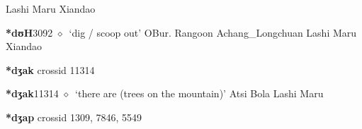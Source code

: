 \begin{list}{}{\leftmargin=1.5em \itemindent=-1.5em}
\hspace{1ex}
         Lashi 
\hspace{1ex}
         Maru 
\hspace{1ex}
         Xiandao 
  \item {\footnotesize \textbf{*dʊH}}{\tiny 3092}
\hspace{1ex}
         $\diamond$~`dig / scoop out'
         OBur. 
\hspace{1ex}
         Rangoon 
\hspace{1ex}
         Achang\_Longchuan 
\hspace{1ex}
         Lashi 
\hspace{1ex}
         Maru 
\hspace{1ex}
         Xiandao 
  \end{list}
\item
\textbf{*dʒak}
  {\tiny crossid 11314}
  \begin{list}{}{\leftmargin=1.5em \itemindent=-1.5em}
  \item {\footnotesize \textbf{*dʒak}}{\tiny 11314}
         $\diamond$~`there are (trees on the mountain)'
         Atsi 
\hspace{1ex}
         Bola 
\hspace{1ex}
         Lashi 
\hspace{1ex}
         Maru 
  \end{list}
\item
\textbf{*dʒap}
  {\tiny crossid 1309, 7846, 5549}
